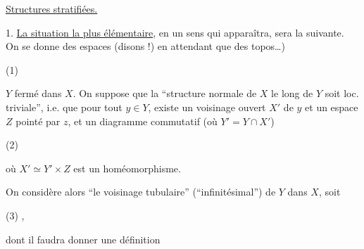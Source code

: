 
\uline{Structures stratifiées.}

1. \uline{La situation la plus élémentaire}, en un sens qui apparaîtra, sera la suivante. On se donne des espaces (disons !) en attendant que   des topos\ldots)

(1)

$Y$ fermé dans $X$. On suppose que la ``structure normale de $X$ le long de $Y$ soit loc. triviale''\unsure{)}, i.e. que pour tout $y\in Y$, existe un voisinage ouvert $X'$ de $y$ et un espace $Z$ pointé par $z$, et un diagramme commutatif (où $Y'=Y\cap X'$)

(2)

où $X'\simeq Y'\times Z$ est un homéomorphisme.

On considère alors ``le voisinage tubulaire'' (``infinitésimal'') de $Y$ dans $X$, soit

(3)
,

dont il faudra donner une définition

